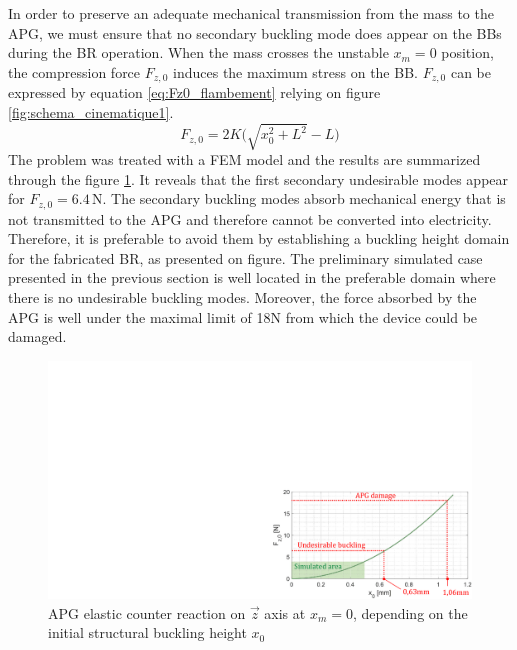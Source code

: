 \documentclass[3p,twocolumn,preprint]{elsarticle}
\begin{document}
In order to preserve an adequate mechanical transmission from the mass to the APG, we must ensure that no secondary buckling mode does appear on the BBs during the BR operation. When the mass crosses the unstable \mbox{$x_m=0$} position, the compression force $F_{z,0}$ induces the maximum stress on the BB. $F_{z,0}$ can be expressed by equation \ref{eq:Fz0_flambement} relying on figure \ref{fig:schema_cinematique1}.
\begin{equation}
	F_{z,0} = 2K \biggl( \sqrt{x_0^2+L^2}-L \biggr)
	\label{eq:Fz0_flambement}
\end{equation}
The problem was treated with a FEM model and the results are summarized through the figure \ref{fig:buckling_limit}. It reveals that the first secondary undesirable modes appear for $F_{z,0}=6.4$\,N. The secondary buckling modes absorb mechanical energy that is not transmitted to the APG and therefore cannot be converted into electricity. Therefore, it is preferable to avoid them by establishing a buckling height domain for the fabricated BR, as presented on figure. The preliminary simulated case presented in the previous section is well located in the preferable domain where there is no undesirable buckling modes. Moreover, the force absorbed by the APG is well under the maximal limit of 18N from which the device could be damaged.
\begin{figure}[!htbp]
	\centering
	\captionsetup{justification=centering}
	\includegraphics[trim={17.9cm 0cm 0cm 10cm},clip,width=0.9\linewidth]{figures/buckling_limit.pdf}
	\caption{APG elastic counter reaction on $\vec{z}$ axis at $x_m=0$, depending on the initial structural buckling height $x_0$}
	\label{fig:buckling_limit}
\end{figure}

\end{document}
